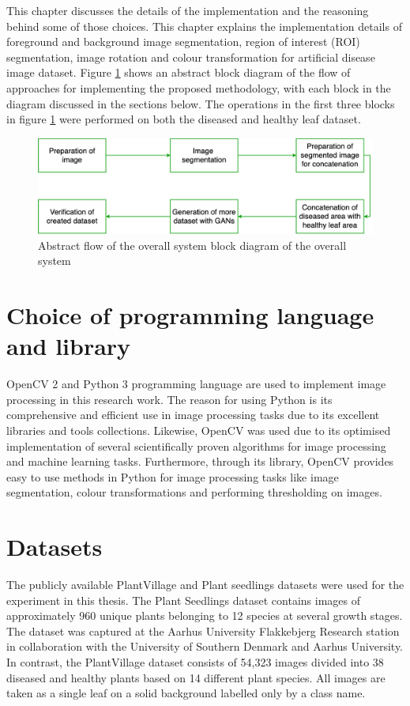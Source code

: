 This chapter discusses the details of the implementation and the reasoning behind some of those choices. This chapter explains the implementation details of foreground and background image segmentation, region of interest (ROI) segmentation, image rotation and colour transformation for artificial disease image dataset. Figure \ref{fig:my_abs_block} shows an abstract block diagram of the flow of approaches for implementing the proposed methodology, with each block in the diagram discussed in the sections below. 
The operations in the first three blocks in figure \ref{fig:my_abs_block} were performed on both the diseased and healthy leaf dataset.
\begin{figure}[!htb]
    \includegraphics[scale=0.4, keepaspectratio]{Figures/block_diagram v2.png}
    \caption{Abstract flow of the overall system block diagram of the overall system}
    \label{fig:my_abs_block}
\end{figure}

\section{Choice of programming language and library}
OpenCV 2 and Python 3 programming language are used to implement image processing in this research work. The reason for using Python is its comprehensive and efficient use in image processing tasks due to its excellent libraries and tools collections. Likewise, OpenCV was used due to its optimised implementation of several scientifically proven algorithms for image processing and machine learning tasks. Furthermore, through its library, OpenCV provides easy to use methods in Python for image processing tasks like image segmentation, colour transformations and performing thresholding on images. 

\section{Datasets}
The publicly available PlantVillage \cite{hughes2015open} and Plant seedlings \cite{Giselsson2017} datasets were used for the experiment in this thesis. The Plant Seedlings dataset contains images of approximately 960 unique plants belonging to 12 species at several growth stages. The dataset was captured at the Aarhus University Flakkebjerg Research station in collaboration with the University of Southern Denmark and Aarhus University. In contrast, the PlantVillage dataset consists of 54,323 images divided into 38 diseased and healthy plants based on 14 different plant species. All images are taken as a single leaf on a solid background labelled only by a class name.

